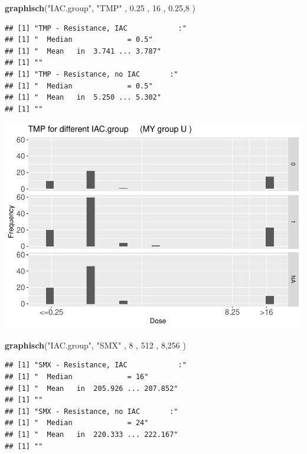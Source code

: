 \documentclass[
]{article}
\newenvironment{Shaded}{\begin{snugshade}}{\end{snugshade}}
\newcommand{\DecValTok}[1]{\textcolor[rgb]{0.00,0.00,0.81}{#1}}
\newcommand{\FloatTok}[1]{\textcolor[rgb]{0.00,0.00,0.81}{#1}}
\newcommand{\KeywordTok}[1]{\textcolor[rgb]{0.13,0.29,0.53}{\textbf{#1}}}
\newcommand{\NormalTok}[1]{#1}
\newcommand{\StringTok}[1]{\textcolor[rgb]{0.31,0.60,0.02}{#1}}
\begin{document}
\begin{Shaded}
\begin{Highlighting}[]
   \KeywordTok{graphisch}\NormalTok{(}\StringTok{"IAC.group"}\NormalTok{, }\StringTok{"TMP"}\NormalTok{ , }\FloatTok{0.25}\NormalTok{ ,  }\DecValTok{16}\NormalTok{   ,   }\FloatTok{0.25}\NormalTok{,}\DecValTok{8}\NormalTok{    ) }
\end{Highlighting}
\end{Shaded}

\begin{verbatim}
## [1] "TMP - Resistance, IAC            :"
## [1] "  Median             = 0.5"
## [1] "  Mean   in  3.741 ... 3.787"
## [1] ""
## [1] "TMP - Resistance, no IAC       :"
## [1] "  Median             = 0.5"
## [1] "  Mean   in  5.250 ... 5.302"
## [1] ""
\end{verbatim}

\includegraphics{Verteilungen_files/figure-latex/unnamed-chunk-16-1.pdf}

\begin{Shaded}
\begin{Highlighting}[]
   \KeywordTok{graphisch}\NormalTok{(}\StringTok{"IAC.group"}\NormalTok{, }\StringTok{"SMX"}\NormalTok{ , }\DecValTok{8}\NormalTok{    , }\DecValTok{512}\NormalTok{   ,   }\DecValTok{8}\NormalTok{,}\DecValTok{256}\NormalTok{    ) }
\end{Highlighting}
\end{Shaded}

\begin{verbatim}
## [1] "SMX - Resistance, IAC            :"
## [1] "  Median             = 16"
## [1] "  Mean   in  205.926 ... 207.852"
## [1] ""
## [1] "SMX - Resistance, no IAC       :"
## [1] "  Median             = 24"
## [1] "  Mean   in  220.333 ... 222.167"
## [1] ""
\end{verbatim}
\end{document}
